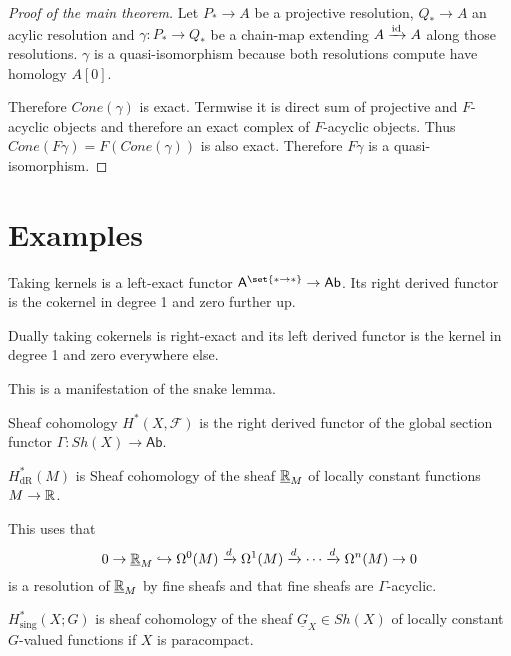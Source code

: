 \documentclass[fontsize=11pt,fleqn,a4paper]{scrartcl}
\begin{document}
\begin{proof}[Proof of the main theorem]
Let $P_\ast \to A$ be a projective resolution, $Q_\ast \to A$ an acylic resolution and $\gamma: P_\ast\to Q_\ast$ be a chain-map extending $A\xrightarrow{\operatorname{id}} A$ along those resolutions. $\gamma$ is a quasi-isomorphism because both resolutions compute have homology $A[0]$.

Therefore $Cone(\gamma)$ is exact. Termwise it is direct sum of projective and $F$-acyclic objects and therefore an exact complex of $F$-acyclic objects. Thus $Cone(F\gamma) = F(Cone(\gamma))$ is also exact. Therefore $F\gamma$ is a quasi-isomorphism.
\end{proof}

\section{Examples}

\begin{example}
Taking kernels is a left-exact functor $\mathsf{A}^{\set{\ast\to\ast}} \to \mathsf{Ab}$. Its right derived functor is the cokernel in degree 1 and zero further up.

Dually taking cokernels is right-exact and its left derived functor is the kernel in degree 1 and zero everywhere else.

This is a manifestation of the snake lemma.
\end{example}

\begin{example}
Sheaf cohomology $H^\ast(X,\mathcal{F})$ is the right derived functor of the global section functor $\Gamma: Sh(X) \to \mathsf{Ab}$.
\end{example}

\begin{example}
$H_\text{dR}^\ast(M)$ is Sheaf cohomology of the sheaf $\underline{\mathbb{R}}_M$ of locally constant functions $M\to\mathbb{R}$.

This uses that
\[0 \to \underline{\mathbb{R}}_M \hookrightarrow \Omega^0(M) \xrightarrow{d} \Omega^1(M) \xrightarrow{d} \cdots \xrightarrow{d} \Omega^n(M) \to 0\]
is a resolution of $\underline{\mathbb{R}}_M$ by fine sheafs and that fine sheafs are $\Gamma$-acyclic.
\end{example}

\begin{example}
$H_\text{sing}^\ast(X;G)$ is sheaf cohomology of the sheaf $\underline{G}_X\in Sh(X)$ of locally constant $G$-valued functions if $X$ is paracompact.
\end{example}
\end{document}

